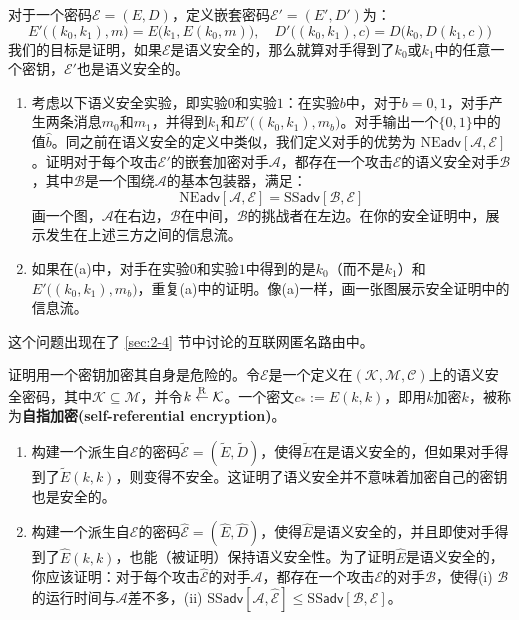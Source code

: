 \begin{exercise}[嵌套加密]\label{exer:2-15}
对于一个密码$\mathcal{E}=(E,D)$，定义嵌套密码$\mathcal{E}'=(E',D')$为：
\[
E'\big((k_0,k_1),m\big)=E\big(k_1,E(k_0,m)\big),\quad
D'\big((k_0,k_1),c\big)=D\big(k_0,D(k_1,c)\big)
\]
我们的目标是证明，如果$\mathcal{E}$是语义安全的，那么就算对手得到了$k_0$或$k_1$中的任意一个密钥，$\mathcal{E}'$也是语义安全的。
\begin{enumerate}[\indent(a)]
	\item 考虑以下语义安全实验，即实验$0$和实验$1$：在实验$b$中，对于$b=0,1$，对手产生两条消息$m_0$和$m_1$，并得到$k_1$和$E'\big((k_0,k_1),m_b\big)$。对手输出一个$\{0,1\}$中的值$\hat b$。同之前在语义安全的定义中类似，我们定义对手的优势为 $\mathrm{NE}\mathsf{adv}[\mathcal{A},\mathcal{E}]$。证明对于每个攻击$\mathcal{E}'$的嵌套加密对手$\mathcal{A}$，都存在一个攻击$\mathcal{E}$的语义安全对手$\mathcal{B}$，其中$\mathcal{B}$是一个围绕$\mathcal{A}$的基本包装器，满足：
	\[
	\mathrm{NE}\mathsf{adv}[\mathcal{A},\mathcal{E}]=\mathrm{SS}\mathsf{adv}[\mathcal{B},\mathcal{E}]
	\]
	画一个图，$\mathcal{A}$在右边，$\mathcal{B}$在中间，$\mathcal{B}$的挑战者在左边。在你的安全证明中，展示发生在上述三方之间的信息流。
	\item 如果在(a)中，对手在实验$0$和实验$1$中得到的是$k_0$（而不是$k_1$）和$E'\big((k_0,k_1),m_b\big)$，重复(a)中的证明。像(a)一样，画一张图展示安全证明中的信息流。
\end{enumerate}
这个问题出现在了 \ref{sec:2-4} 节中讨论的互联网匿名路由中。
\end{exercise}

\begin{exercise}[自指加密]\label{exer:2-16}
证明用一个密钥加密其自身是危险的。令$\mathcal{E}$是一个定义在$(\mathcal{K},\mathcal{M},\mathcal{C})$上的语义安全密码，其中$\mathcal{K}\subseteq\mathcal{M}$，并令$k\overset{\rm R}\leftarrow\mathcal{K}$。一个密文$c_*:=E(k,k)$，即用$k$加密$k$，被称为\textbf{自指加密(self-referential encryption)}。
\begin{enumerate}[\indent(a)]
	\item 构建一个派生自$\mathcal{E}$的密码$\mathcal{\tilde{E}}=(\tilde{E},\tilde{D})$，使得$\tilde{E}$在是语义安全的，但如果对手得到了$\tilde{E}(k,k)$，则变得不安全。这证明了语义安全并不意味着加密自己的密钥也是安全的。
	\item 构建一个派生自$\mathcal{E}$的密码$\mathcal{\hat{E}}=(\hat{E},\hat{D})$，使得$\hat{E}$是语义安全的，并且即使对手得到了$\hat{E}(k,k)$，也能（被证明）保持语义安全性。为了证明$\hat{E}$是语义安全的，你应该证明：对于每个攻击$\mathcal{\hat{E}}$的对手$\mathcal{A}$，都存在一个攻击$\mathcal{E}$的对手$\mathcal{B}$，使得(i) $\mathcal{B}$的运行时间与$\mathcal{A}$差不多，(ii) $\mathrm{SS}\mathsf{adv}[\mathcal{A},\mathcal{\hat{E}}]\leq\mathrm{SS}\mathsf{adv}[\mathcal{B},\mathcal{E}]$。
\end{enumerate}
\end{exercise}

